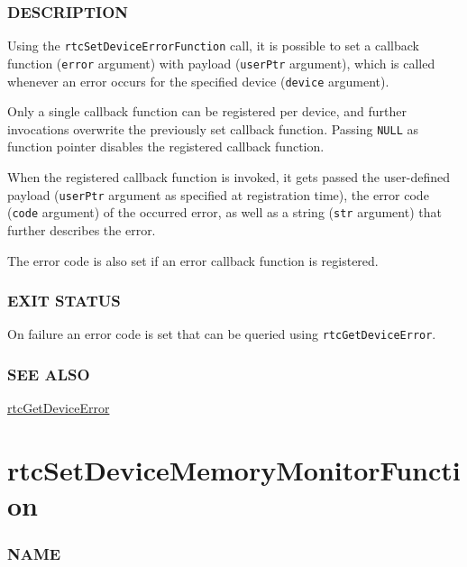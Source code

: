 \subsubsection{DESCRIPTION}\label{description}

Using the \texttt{rtcSetDeviceErrorFunction} call, it is possible to set
a callback function (\texttt{error} argument) with payload
(\texttt{userPtr} argument), which is called whenever an error occurs
for the specified device (\texttt{device} argument).

Only a single callback function can be registered per device, and
further invocations overwrite the previously set callback function.
Passing \texttt{NULL} as function pointer disables the registered
callback function.

When the registered callback function is invoked, it gets passed the
user-defined payload (\texttt{userPtr} argument as specified at
registration time), the error code (\texttt{code} argument) of the
occurred error, as well as a string (\texttt{str} argument) that further
describes the error.

The error code is also set if an error callback function is registered.

\subsubsection{EXIT STATUS}\label{exit-status}

On failure an error code is set that can be queried using
\texttt{rtcGetDeviceError}.

\subsubsection{SEE ALSO}\label{see-also}

\hyperref[rtcgetdeviceerror]{rtcGetDeviceError}

\pagebreak

\section{rtcSetDeviceMemoryMonitorFunction}\label{rtcsetdevicememorymonitorfunction}

\subsubsection{NAME}\label{name}

\begin{Shaded}
\begin{Highlighting}[]
\OperatorTok{{-}}
\end{Highlighting}
\end{Shaded}

